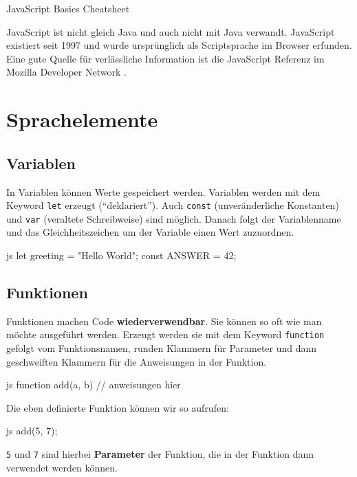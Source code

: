 \documentclass[10pt,a4paper]{article}
\begin{document}
{\color{accentcolor}JavaScript Basics Cheatsheet}

\begin{multicols}{3}

\scriptsize



JavaScript ist nicht gleich Java und auch nicht mit Java verwandt. JavaScript existiert seit 1997 und wurde ursprünglich als Scriptsprache im Browser erfunden. Eine gute Quelle für verlässliche Information ist die JavaScript Referenz im Mozilla Developer Network \cite{mdn-js}.

\section*{Sprachelemente}

\subsection*{Variablen}
In Variablen können Werte gespeichert werden. Variablen werden mit dem Keyword \texttt{let} erzeugt (\enquote{deklariert}). Auch \texttt{const} (unveränderliche Konstanten) und \texttt{var} (veraltete Schreibweise) sind möglich. Danach folgt der Variablenname und das Gleichheitszeichen um der Variable einen Wert zuzuordnen.
\begin{codebox}{js}{}
  let greeting = "Hello World";
  const ANSWER = 42;
\end{codebox}

\subsection*{Funktionen}
Funktionen machen Code \textbf{wiederverwendbar}. Sie können so oft wie man möchte ausgeführt werden. Erzeugt werden sie mit dem Keyword \texttt{function} gefolgt vom Funktionsnamen, runden Klammern für Parameter und dann geschweiften Klammern für die Anweisungen in der Funktion.
\begin{codebox}{js}{}
  function add(a, b) {
    // anweisungen hier
  }
\end{codebox}
Die eben definierte Funktion können wir so aufrufen:
\begin{codebox}{js}{}
  add(5, 7);
\end{codebox}
\texttt{5} und \texttt{7} sind hierbei \textbf{Parameter} der Funktion, die in der Funktion dann verwendet werden können.


\end{multicols}
\end{document}
